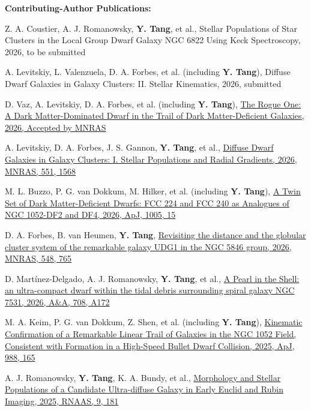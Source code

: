 \documentclass[letterpaper,11pt]{article}
\begin{document}
{\bf Contributing-Author Publications:}
\vspace{-0.15cm}
\begin{etaremune}[itemsep=-2pt]
\item Z. A. Coustier, A. J. Romanowsky, {\bf Y. Tang}, et al., {Stellar Populations of Star Clusters in the Local Group Dwarf Galaxy NGC 6822 Using Keck Spectroscopy, 2026, to be submitted}
\item A. Levitskiy, L. Valenzuela, D. A. Forbes, et al. (including {\bf Y. Tang}), {Diffuse Dwarf Galaxies in Galaxy Clusters: II. Stellar Kinematics, 2026, submitted}
\item D. Vaz, A. Levitskiy, D. A. Forbes, et al. (including {\bf Y. Tang}), \href{https://arxiv.org/abs/2610.07467}{The Rogue One: A Dark Matter-Dominated Dwarf in the Trail of Dark Matter-Deficient Galaxies, 2026, Accepted by MNRAS}
\item A. Levitskiy, D. A. Forbes, J. S. Gannon, {\bf Y. Tang}, et al., \href{https://ui.adsabs.harvard.edu/abs/2026MNRAS.551g1568L/abstract}{Diffuse Dwarf Galaxies in Galaxy Clusters: I. Stellar Populations and Radial Gradients, 2026, MNRAS, 551, 1568}
\item M. L. Buzzo, P. G. van Dokkum, M. Hilker, et al. (including {\bf Y. Tang}), \href{https://ui.adsabs.harvard.edu/abs/2026arXiv260524099B/abstract}{A Twin Set of Dark Matter-Deficient Dwarfs: FCC 224 and FCC 240 as Analogues of NGC 1052-DF2 and DF4, 2026, ApJ, 1005, 15}
\item D. A. Forbes, B. van Heumen, {\bf Y. Tang}, \href{https://ui.adsabs.harvard.edu/abs/2026MNRAS.548ag765F/abstract}{Revisiting the distance and the globular cluster system of the remarkable galaxy UDG1 in the NGC 5846 group, 2026, MNRAS, 548, 765}
\item D. Martínez-Delgado, A. J. Romanowsky, {\bf Y. Tang}, et al., \href{https://ui.adsabs.harvard.edu/abs/2026A%26A...708A.172M/abstract}{A Pearl in the Shell: an ultra-compact dwarf within the tidal debris surrounding spiral galaxy NGC 7531, 2026, A\&A, 708, A172}
\item M. A. Keim, P. G. van Dokkum, Z. Shen, et al. (including {\bf Y. Tang}), \href{https://ui.adsabs.harvard.edu/abs/2025ApJ...988..165K/abstract}{Kinematic Confirmation of a Remarkable Linear Trail of Galaxies in the NGC 1052 Field, Consistent with Formation in a High-Speed Bullet Dwarf Collision, 2025, ApJ, 988, 165}
\item  A. J. Romanowsky, {\bf Y. Tang}, K. A. Bundy, et al., \href{https://ui.adsabs.harvard.edu/abs/2025RNAAS...9..181R/abstract}{Morphology and Stellar Populations of a Candidate Ultra-diffuse Galaxy in Early Euclid and Rubin Imaging, 2025, RNAAS, 9, 181}

\end{etaremune}
\end{document}
